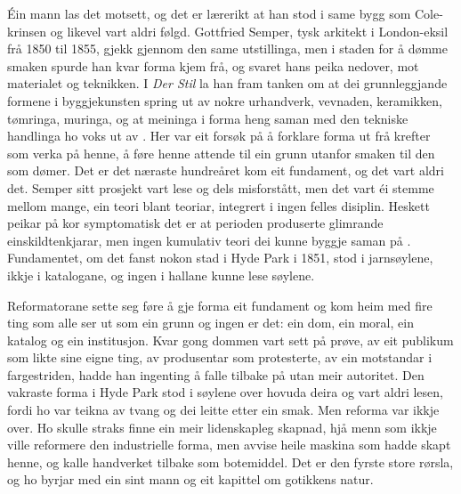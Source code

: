 Éin mann las det motsett, og det er lærerikt at han stod i same bygg som Cole-krinsen og likevel vart aldri følgd. Gottfried Semper, tysk arkitekt i London-eksil frå 1850 til 1855, gjekk gjennom den same utstillinga, men i staden for å dømme smaken spurde han kvar forma kjem frå, og svaret hans peika nedover, mot materialet og teknikken. I \textit{Der Stil} la han fram tanken om at dei grunnleggjande formene i byggjekunsten spring ut av nokre urhandverk, vevnaden, keramikken, tømringa, muringa, og at meininga i forma heng saman med den tekniske handlinga ho voks ut av \autocite{semper1860stil}. Her var eit forsøk på å forklare forma ut frå krefter som verka på henne, å føre henne attende til ein grunn utanfor smaken til den som dømer. Det er det næraste hundreåret kom eit fundament, og det vart aldri det. Semper sitt prosjekt vart lese og dels misforstått, men det vart éi stemme mellom mange, ein teori blant teoriar, integrert i ingen felles disiplin. Heskett peikar på kor symptomatisk det er at perioden produserte glimrande einskildtenkjarar, men ingen kumulativ teori dei kunne byggje saman på \autocite{heskett1980}. Fundamentet, om det fanst nokon stad i Hyde Park i 1851, stod i jarnsøylene, ikkje i katalogane, og ingen i hallane kunne lese søylene.

\vignett

Reformatorane sette seg føre å gje forma eit fundament og kom heim med fire ting som alle ser ut som ein grunn og ingen er det: ein dom, ein moral, ein katalog og ein institusjon. Kvar gong dommen vart sett på prøve, av eit publikum som likte sine eigne ting, av produsentar som protesterte, av ein motstandar i fargestriden, hadde han ingenting å falle tilbake på utan meir autoritet. Den vakraste forma i Hyde Park stod i søylene over hovuda deira og vart aldri lesen, fordi ho var teikna av tvang og dei leitte etter ein smak. Men reforma var ikkje over. Ho skulle straks finne ein meir lidenskapleg skapnad, hjå menn som ikkje ville reformere den industrielle forma, men avvise heile maskina som hadde skapt henne, og kalle handverket tilbake som botemiddel. Det er den fyrste store rørsla, og ho byrjar med ein sint mann og eit kapittel om gotikkens natur.


